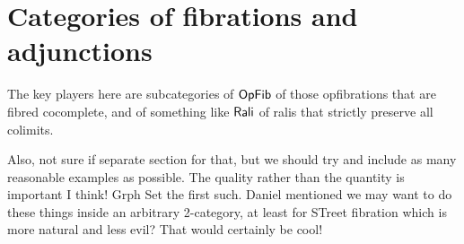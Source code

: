\documentclass{amsart}
\begin{document}
\begin{comment}
Thoughts about these assumptions. Here are the desired examples I can think of now: $ \cat{Set} $ together with $ \cat{Graph} $ or $ \cat{Top} $. The enriched over sets and completeness are both there. So is essential surjectivity. And reflection of isomorphisms.  The continuity is definitely needed, since it's necessary if $ R $ is a right adjoint. 

Go back to the right adjoint we had in the ``converse'' to the above theorem.  That is, we have a coreflection $ \L \dashv R \from \cat{C} \leftrightarrow \cat{D} $ where $ \L $ is left exact.  Of course this gives the continuity of $ R $. Essential surjectivity follows from Gabriel-Zisman. Is it a Street opfibration? $ \L $ is conservative, but is $ R $?

\begin{ex}
  No, $ R $ is not in general conservative.
  Consider the underlying node functor
  $ \Grph \to \Set $.  All $ \Grph $-endomorphisms
  on
  \[
    \begin{tikzpicture}
      \node (a) at (0,0) {$ \bullet $};
      \node (b) at (2,0) {$ \bullet $};
      \draw [->] (a.30) to (b.150);
      \draw [->] (a.-30) to (b.-150);
    \end{tikzpicture}
  \]
  are sent to the identity on $ 2 $.
\end{ex}
\end{comment}

\section{Categories of fibrations and adjunctions}

The key players here are subcategories of $\mathsf{OpFib}$ of those opfibrations that are fibred cocomplete, and of something like
$\mathsf{Rali}$ of ralis that strictly preserve all colimits.

{\chris Also, not sure if separate section for that, but we should try and include as many reasonable examples as possible. The quality rather
than the quantity is important I think! Grph Set the first such.}
{\chris Daniel mentioned we may want to do these things inside an arbitrary 2-category, at least for STreet fibration which is more natural and less evil? That would certainly be cool!}




\end{document}
